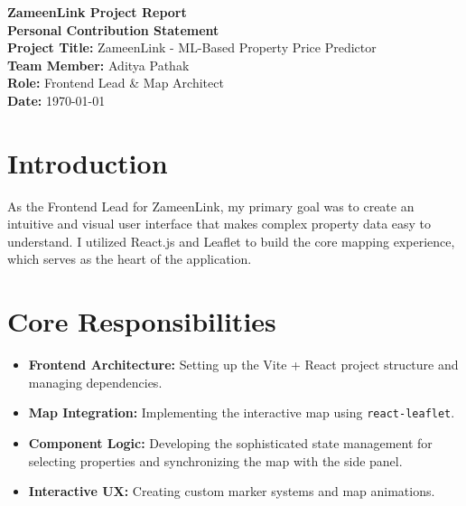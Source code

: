 \documentclass[12pt, a4paper]{article}
\begin{document}
\begin{titlepage}
    \centering
    \vspace*{2cm}
    {\Huge \textbf{ZameenLink Project Report}}\\[1.5cm]
    {\Large \textbf{Personal Contribution Statement}}\\[1cm]
    
    \textbf{Project Title:} ZameenLink - ML-Based Property Price Predictor\\
    \textbf{Team Member:} Aditya Pathak\\
    \textbf{Role:} Frontend Lead \& Map Architect\\
    \textbf{Date:} \today\\[3cm]
    
    \begin{abstract}
        This report outlines Aditya Pathak's contributions to the ZameenLink project, focusing on the core React architecture, Leaflet map integration, and interactive user experience components.
    \end{abstract}
    
    \vfill
\end{titlepage}

\tableofcontents
\newpage

\section{Introduction}
As the Frontend Lead for ZameenLink, my primary goal was to create an intuitive and visual user interface that makes complex property data easy to understand. I utilized React.js and Leaflet to build the core mapping experience, which serves as the heart of the application.

\section{Core Responsibilities}
\begin{itemize}
    \item \textbf{Frontend Architecture:} Setting up the Vite + React project structure and managing dependencies.
    \item \textbf{Map Integration:} Implementing the interactive map using \texttt{react-leaflet}.
    \item \textbf{Component Logic:} Developing the sophisticated state management for selecting properties and synchronizing the map with the side panel.
    \item \textbf{Interactive UX:} Creating custom marker systems and map animations.
\end{itemize}
\end{document}
